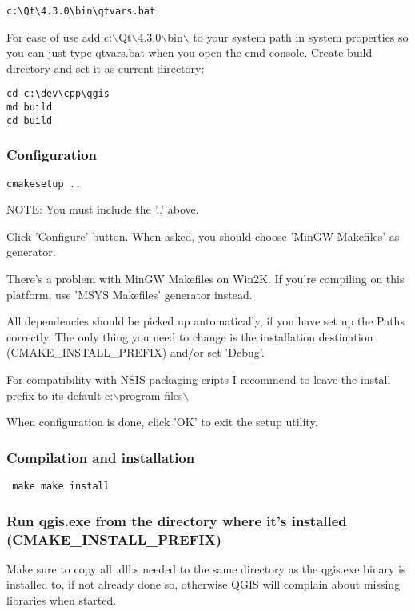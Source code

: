 \begin{verbatim}
c:\Qt\4.3.0\bin\qtvars.bat 
\end{verbatim}

For ease of use add c:$\backslash$Qt$\backslash$4.3.0$\backslash$bin$\backslash$ to your system path in system
properties so you can just type qtvars.bat when you open the cmd console.
Create build directory and set it as current directory:

\begin{verbatim}
cd c:\dev\cpp\qgis 
md build 
cd build 
\end{verbatim}

\hypertarget{toc18}{}
\subsubsection{Configuration}
\begin{verbatim}
cmakesetup ..  
\end{verbatim}

NOTE: You must include the '..' above.

Click 'Configure' button.  When asked, you should choose 'MinGW Makefiles'
as generator.

There's a problem with MinGW Makefiles on Win2K. If you're compiling on this
platform, use 'MSYS Makefiles' generator instead.

All dependencies should be picked up automatically, if you have set up the
Paths correctly. The only thing you need to change is the installation
destination (CMAKE\_INSTALL\_PREFIX) and/or set 'Debug'.

For compatibility with NSIS packaging cripts I recommend to leave the
install prefix to its default c:$\backslash$program files$\backslash$

When configuration is done, click 'OK' to exit the setup utility.

\hypertarget{toc19}{}
\subsubsection{Compilation and installation}
\begin{verbatim}
 make make install 
\end{verbatim}

\hypertarget{toc20}{}
\subsubsection{Run qgis.exe from the directory where it's installed (CMAKE\_INSTALL\_PREFIX)}
Make sure to copy all .dll:s needed to the same directory as the qgis.exe
binary is installed to, if not already done so, otherwise QGIS will complain
about missing libraries when started.

